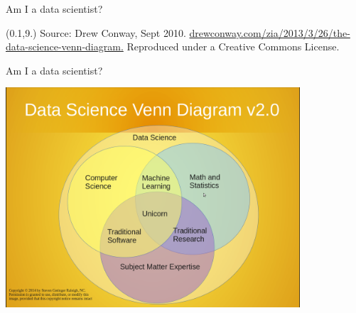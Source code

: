 \documentclass[14pt]{beamer}
\begin{document}
\begin{frame}{Am I a data scientist?}

\begin{textblock}{12.8}(0.1,9.)\fontsize{5}{7}\sffamily
Source: Drew Conway, Sept 2010.  \url{drewconway.com/zia/2013/3/26/the-data-science-venn-diagram.} Reproduced under a Creative Commons License.
\end{textblock}
\end{frame}


\begin{frame}{Am I a data scientist?}\vspace*{-0.2cm}
\centerline{\includegraphics[height=8.2cm]{Venn-Diagram-of-Data-Scientist-Skills-}}
\end{frame}
\end{document}
